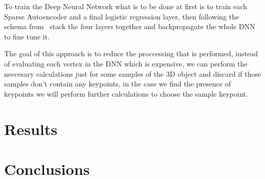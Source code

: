 \documentclass{comjnl}
\begin{document}
To train the Deep Neural Network what is to be done at first is to train each
Sparse Autoencoder and a final logistic regression layer, then following the
schema from~\cite{DNN} stack the four layers together and backpropagate the
whole DNN to fine tune it.

The goal of this approach is to reduce the proccessing that is performed,
instead of evaluating each vertex in the DNN which is expensive, we can
perform the neccesary calculations just for some samples of the 3D object
and discard if those samples don't contain any keypoints, in the case we find
the presence of keypoints we will perform further calculations to choose the
sample keypoint.

\section{Results} \label{Results}

\section{Conclusions} \label{Conclusions}



\nocite{*}


% 

\end{document}
